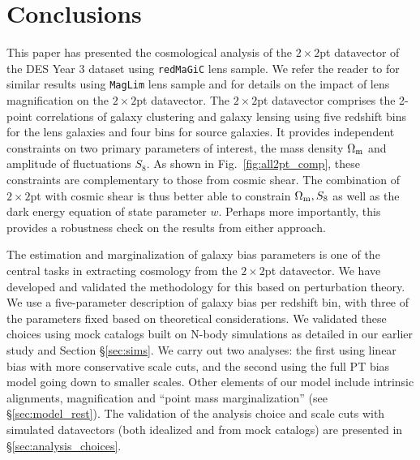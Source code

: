 \documentclass[aps, prd,twocolumn,superscriptaddress,nofootinbib,preprintnumbers]{revtex4-1}
\newcommand{\redmagic}{\texttt{redMaGiC} }
\newcommand{\maglim}{\texttt{MagLim} }
\begin{document}


\section{Conclusions}
\label{sec:conclusions}
This paper has presented the cosmological analysis of the $2\times2$pt datavector of the DES Year 3 dataset using \redmagic lens sample. We refer the reader to \citet{y3-2x2ptaltlensresults} for similar results using \maglim lens sample and \citet*{y3-2x2ptmagnification} for details on the impact of lens magnification on the $2\times2$pt datavector. The $2\times2$pt datavector comprises the 2-point correlations of galaxy clustering and galaxy lensing using five redshift bins for the lens galaxies and four bins for source galaxies. It provides independent constraints on two primary parameters of interest, the mass density $\Omega_{\rm m}$ and amplitude of fluctuations $S_8$. As shown in Fig.~\ref{fig:all2pt_comp}, these constraints are complementary to those from cosmic shear. The combination of $2\times2$pt with cosmic shear is thus better able to constrain $\Omega_{\rm m}, S_8$ as well as the dark energy equation of state parameter $w$. Perhaps more importantly, this provides a robustness check on the results from either approach. 

The estimation and marginalization of galaxy bias parameters is one of the central tasks in extracting cosmology from the $2\times2$pt datavector. We have developed and validated the methodology for this based on perturbation theory. We use a five-parameter description of galaxy bias per redshift bin, with three of the parameters fixed based on theoretical considerations. We validated these choices using mock catalogs built on N-body simulations as detailed in our earlier study \citep{p2020perturbation} and Section \S\ref{sec:sims}.  
We carry out two analyses: the first using linear bias with more conservative scale cuts, and the second using the full PT bias model going down to smaller scales. Other  elements of our model include intrinsic alignments, magnification and ``point mass marginalization'' (see \S\ref{sec:model_rest}). The validation of the analysis choice and scale cuts with simulated datavectors (both idealized and from mock catalogs) are presented in \S\ref{sec:analysis_choices}. 
\end{document}
